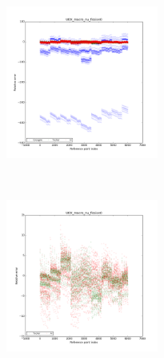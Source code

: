 \begin{center}
\begin{figure}[!h]
    \centering
    \begin{subfigure}[b]{0.45\textwidth}
				\includegraphics[width=\linewidth,height=5cm]{images/UOX/UOX_macro_nu_fission0_with_cocagne.png}
    \end{subfigure}
		~
    \begin{subfigure}[b]{0.45\textwidth}
        \includegraphics[width=\linewidth,height=5cm]{images/UOX/UOX_macro_nu_fission0.png}
    \end{subfigure}


\end{figure}
\end{center}
